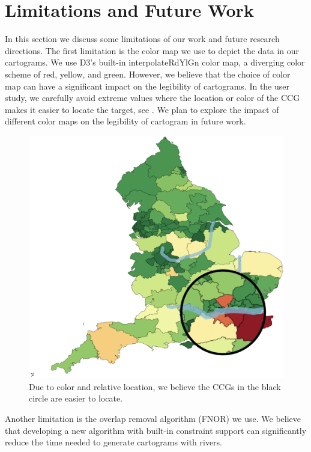 \section{Limitations and Future Work}

In this section we discuss some limitations of our work and future research directions. The first limitation is the color map we use to depict the data in our cartograms. We use D3's built-in interpolateRdYlGn color map, a diverging color scheme of red, yellow, and green. However, we believe that the choice of color map can have a significant impact on the legibility of cartograms. In the user study, we carefully avoid extreme values where the location or color of the CCG makes it easier to locate the target, see . We plan to explore the impact of different color maps on the legibility of cartogram in future work.

{
    \begin{figure}[tb!]
        \centering
        \includegraphics[width=\columnwidth,keepaspectratio]{figure/limitations/extreme.png}
        \caption{Due to color and relative location, we believe the CCGs in the black circle are easier to locate.}
        \label{fig:extreme}
    \end{figure}
}

Another limitation is the overlap removal algorithm (FNOR) we use. We believe that developing a new algorithm with built-in constraint support can significantly reduce the time needed to generate cartograms with rivers.
